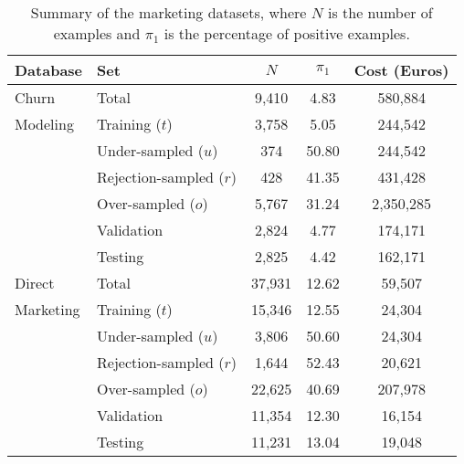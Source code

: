 \begin{table}%
  \centering
  \footnotesize
  \begin{tabular}{l l c c c } %
    \hline
    \textbf{Database}& \textbf{Set}&  $N$ & $\pi_1$ & Cost (Euros) \\
    \hline
    Churn&Total&9,410&4.83&580,884\\
    Modeling&Training ($t$)&3,758&5.05&244,542\\
    &Under-sampled ($u$) &374&50.80&244,542\\
    &Rejection-sampled ($r$)&428&41.35&431,428\\
    &Over-sampled ($o$) &5,767&31.24&2,350,285\\
    &Validation&2,824&4.77&174,171\\
    &Testing&2,825&4.42&162,171\\
    \hline
    Direct &Total&37,931&12.62&59,507\\
    Marketing&Training ($t$)&15,346&12.55&24,304\\
    &Under-sampled ($u$)&3,806&50.60&24,304\\
    &Rejection-sampled ($r$)&1,644&52.43&20,621\\
    &Over-sampled ($o$)&22,625&40.69&207,978\\
    &Validation&11,354&12.30&16,154\\
    &Testing&11,231&13.04&19,048\\
    \hline
  \end{tabular}
  \caption{Summary of the marketing datasets, where $N$ is the number of examples and $\pi_1$ is 
  the percentage of positive examples.}
  \label{tab:5:databases}
\end{table}
 
